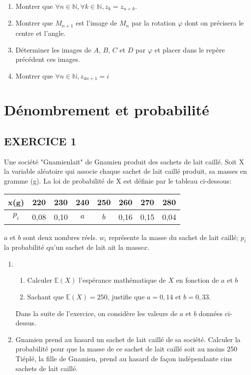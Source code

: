 \documentclass[12pts]{book}
\begin{document}
\begin{enumerate}
\begin{enumerate}
					\begin{enumerate}
						\item Montrer que $\forall n \in \mathbb{N}, \forall k \in \mathbb{N}, z_k=z_{n+k}$.
						\item Montrer que $M_{n+1}$ est l'image de $M_n$ par la rotation $\varphi$ dont on précisera le centre et l'angle.
						\item Déterminer les images de $A$, $B$, $C$ et $D$ par $\varphi$ et placer dans le repère précédent ces images.
						\item Montrer que $\forall n\in \mathbb{N}, z_{4n+1}=i$
					\end{enumerate}
			\end{enumerate}
	\end{enumerate}
	
	\chapter{Dénombrement et probabilité}
	\section*{EXERCICE 1}	
	Une société "Gnamienlait" de Gnamien produit des sachets de lait caillé. Soit X la variable aléatoire qui associe chaque sachet de lait caillé produit, sa masses en gramme (g). La loi de probabilité de X est définie par le tableau ci-dessous:
	\begin{tabular}{|c|c|c|c|c|c|c|c|}
		\hline 
		x(g) & 220 &230 & 240 & 250 & 260 & 270 & 280 \\ \hline 
		$p_i$ & 0,08& 0,10 & $a$ &$b$& 0,16 & 0,15 & 0,04 
	\\	\hline
	\end{tabular}
	$a$ et $b$ sont deux nombres réels.
	$w_i$ représente la masse du sachet de lait caillé; $p_i$ la probabilité qu'un sachet de lait ait la masse$x$.
	\begin{enumerate}
		\item \begin{enumerate}
			\item Calculer $\mathbb{E}(X)$ l'espérance mathématique de $X$ en fonction de $a$ et $b$
			\item Sachant que $\mathbb{E}(X)=250$, justifie que $a=0,14$ et $b=0,33.$ 
		\end{enumerate}
	Dans la suite de l'exercice, on considère les valeurs de $a$ et $b$ données ci-dessus.
	\item Gnamien prend au hasard un sachet de lait caillé de sa société.  Calculer la probabilité pour que la masse de ce sachet de lait caillé soit au moins 250\\
	Tiéplé, la fille de Gnamien, prend au hasard de façon indépendante cins sachets de lait caillé.
	\end{enumerate}
\end{document}
